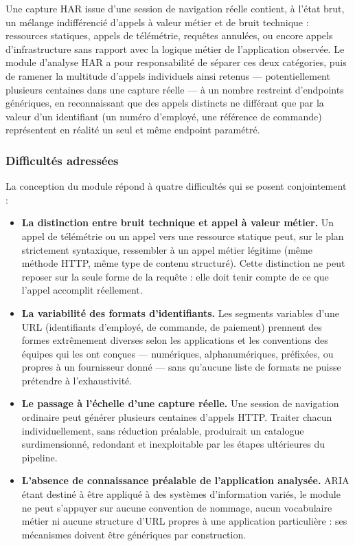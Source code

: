 Une capture HAR issue d'une session de navigation réelle contient, à l'état brut, un mélange indifférencié d'appels à valeur métier et de bruit technique : ressources statiques, appels de télémétrie, requêtes annulées, ou encore appels d'infrastructure sans rapport avec la logique métier de l'application observée. Le module d'analyse HAR a pour responsabilité de séparer ces deux catégories, puis de ramener la multitude d'appels individuels ainsi retenus — potentiellement plusieurs centaines dans une capture réelle — à un nombre restreint d'endpoints génériques, en reconnaissant que des appels distincts ne différant que par la valeur d'un identifiant (un numéro d'employé, une référence de commande) représentent en réalité un seul et même endpoint paramétré.

\subsubsection{Difficultés adressées}

La conception du module répond à quatre difficultés qui se posent conjointement :

\begin{itemize}
    \item \textbf{La distinction entre bruit technique et appel à valeur métier.} Un appel de télémétrie ou un appel vers une ressource statique peut, sur le plan strictement syntaxique, ressembler à un appel métier légitime (même méthode HTTP, même type de contenu structuré). Cette distinction ne peut reposer sur la seule forme de la requête : elle doit tenir compte de ce que l'appel accomplit réellement.
    \item \textbf{La variabilité des formats d'identifiants.} Les segments variables d'une URL (identifiants d'employé, de commande, de paiement) prennent des formes extrêmement diverses selon les applications et les conventions des équipes qui les ont conçues — numériques, alphanumériques, préfixées, ou propres à un fournisseur donné — sans qu'aucune liste de formats ne puisse prétendre à l'exhaustivité.
    \item \textbf{Le passage à l'échelle d'une capture réelle.} Une session de navigation ordinaire peut générer plusieurs centaines d'appels HTTP. Traiter chacun individuellement, sans réduction préalable, produirait un catalogue surdimensionné, redondant et inexploitable par les étapes ultérieures du pipeline.
    \item \textbf{L'absence de connaissance préalable de l'application analysée.} ARIA étant destiné à être appliqué à des systèmes d'information variés, le module ne peut s'appuyer sur aucune convention de nommage, aucun vocabulaire métier ni aucune structure d'URL propres à une application particulière : ses mécanismes doivent être génériques par construction.
\end{itemize}

